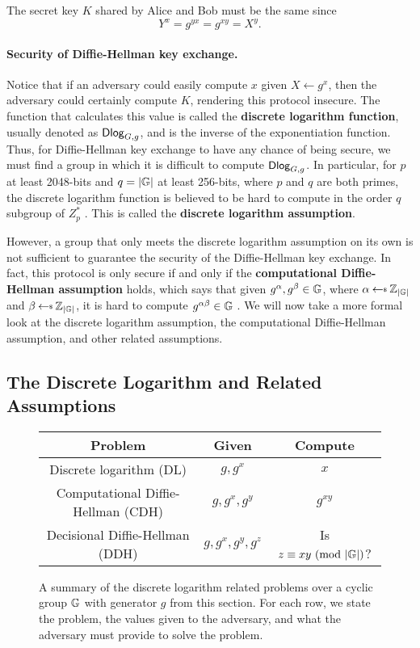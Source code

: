 The secret key $K$ shared by Alice and Bob must be the same since
\begin{equation*}
	Y^x = g^{yx} = g^{xy} = X^y.
\end{equation*}

\paragraph{Security of Diffie-Hellman key exchange.} Notice that if an adversary could easily compute $x$ given $X \gets g^x$, then the adversary could certainly compute $K$, rendering this protocol insecure. The function that calculates this value is called the \textbf{discrete logarithm function}, usually denoted as $\mathsf{Dlog}_{G,g}$, and is the inverse of the exponentiation function. Thus, for Diffie-Hellman key exchange to have any chance of being secure, we must find a group in which it is difficult to compute $\mathsf{Dlog}_{G,g}$. In particular, for $p$ at least 2048-bits and $q = |\mathbb{G}|$ at least 256-bits, where $p$ and $q$ are both primes, the discrete logarithm function is believed to be hard to compute in the order $q$ subgroup of $Z_p^*$ \cite{BonehShoupBook}. This is called the \textbf{discrete logarithm assumption}.

However, a group that only meets the discrete logarithm assumption on its own is not sufficient to guarantee the security of the Diffie-Hellman key exchange. In fact, this protocol is only secure if and only if the \textbf{computational Diffie-Hellman assumption} holds, which says that given $g^\alpha, g^\beta \in \mathbb{G}$, where $\alpha \getsr \Z_{|\group|}$ and $\beta \getsr \Z_{|\group|}$, it is hard to compute $g^{\alpha\beta} \in \mathbb{G}$ \cite{BonehShoupBook}. We will now take a more formal look at the discrete logarithm assumption, the computational Diffie-Hellman assumption, and other related assumptions. 

\subsection{The Discrete Logarithm and Related Assumptions}

\begin{figure}
	\center
	\begin{tabular}{|c|c|c|}
		\hline
		Problem & Given & Compute \\
		\hline \hline
		Discrete logarithm (DL) & $g, g^x$ & $x$ \\
		\hline
		Computational Diffie-Hellman (CDH) & $g,g^x,g^y$ & $g^{xy}$ \\
		\hline
		Decisional Diffie-Hellman (DDH) & $g, g^x, g^y, g^z$ & Is $z \equiv xy\ (\textrm{mod}\ |\mathbb{G}|)$? \\
		\hline
	\end{tabular}
	\caption{A summary of the discrete logarithm related problems over a cyclic group $\mathbb{G}$ with generator $g$ from this section. For each row, we state the problem, the values given to the adversary, and what the adversary must provide to solve the problem.}
	\label{fig:DL}
\end{figure}

